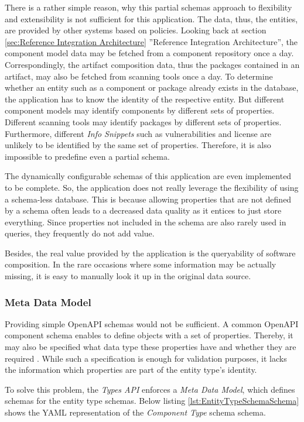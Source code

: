 There is a rather simple reason, why this partial schemas approach to flexibility and extensibility is not sufficient for this application. The data, thus, the entities, are provided by other systems based on policies. Looking back at section \ref{sec:Reference Integration Architecture} ''Reference Integration Architecture'', the component model data may be fetched from a component repository once a day. Correspondingly, the artifact composition data, thus the packages contained in an artifact, may also be fetched from scanning tools once a day. To determine whether an entity such as a component or package already exists in the database, the application has to know the identity of the respective entity. But different component models may identify components by different sets of properties. Different scanning tools may identify packages by different sets of properties. Furthermore, different \emph{Info Snippets} such as vulnerabilities and license are unlikely to be identified by the same set of properties. Therefore, it is also impossible to predefine even a partial schema.\par 
The dynamically configurable schemas of this application are even implemented to be complete. So, the application does not really leverage the flexibility of using a schema-less database. This is because allowing properties that are not defined by a schema often leads to a decreased data quality as it entices to just store everything. Since properties not included in the schema are also rarely used in queries, they frequently do not add value.\par 
Besides, the real value provided by the application is the queryability of software composition. In the rare occasions where some information may be actually missing, it is easy to manually look it up in the original data source.  


\subsubsection{Meta Data Model} \label{sec:Meta Data Model}
Providing simple OpenAPI schemas would not be sufficient. A common OpenAPI component schema enables to define objects with a set of properties. Thereby, it may also be specified what data type these properties have and whether they are required \cite{OpenAPISpec}. While such a specification is enough for validation purposes, it lacks the information which properties are part of the entity type's identity.\par 
To solve this problem, the \emph{Types API} enforces a \emph{Meta Data Model}, which defines schemas for the entity type schemas. Below listing \ref{lst:EntityTypeSchemaSchema} shows the YAML representation of the \emph{Component Type} schema schema.

